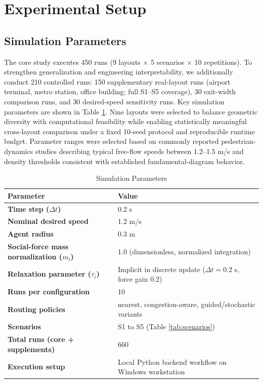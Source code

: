 \documentclass[utf8]{FrontiersinHarvard}
\begin{document}
\section{Experimental Setup}
\subsection{Simulation Parameters}
The core study executes 450 runs (9 layouts $\times$ 5 scenarios $\times$ 10 repetitions). To strengthen generalization and engineering interpretability, we additionally conduct 210 controlled runs: 150 supplementary real-layout runs (airport terminal, metro station, office building; full S1--S5 coverage), 30 exit-width comparison runs, and 30 desired-speed sensitivity runs. Key simulation parameters are shown in Table \ref{tab:sim_params}.
Nine layouts were selected to balance geometric diversity with computational feasibility while enabling statistically meaningful cross-layout comparison under a fixed 10-seed protocol and reproducible runtime budget.
Parameter ranges were selected based on commonly reported pedestrian-dynamics studies describing typical free-flow speeds between 1.2--1.5 m/s and density thresholds consistent with established fundamental-diagram behavior.

\begin{table}[t]
\centering
\caption{Simulation Parameters}
\label{tab:sim_params}
{\footnotesize
\setlength{\tabcolsep}{3pt}
\begin{tabular}{>{\bfseries}p{2.25cm} p{4.55cm}}
\toprule
Parameter & Value \\
\midrule
Time step ($\Delta t$) & 0.2 s \\
Nominal desired speed & 1.2 m/s \\
Agent radius & 0.3 m \\
Social-force mass normalization ($m_i$) & 1.0 (dimensionless, normalized integration) \\
Relaxation parameter ($\tau_i$) & Implicit in discrete update ($\Delta t=0.2$ s, force gain 0.2) \\
Runs per configuration & 10 \\
Routing policies & nearest, congestion-aware, guided/stochastic variants \\
Scenarios & S1 to S5 (Table \ref{tab:scenarios}) \\
Total runs (core + supplements) & 660 \\
Execution setup & Local Python backend workflow on Windows workstation \\
\bottomrule
\end{tabular}
}
\end{table}
\end{document}
